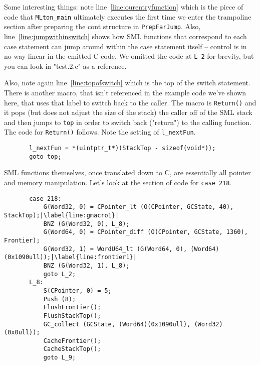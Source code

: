 Some interesting things: note line~\ref{line:ourentryfunction} which is the piece of code that \texttt{MLton\_main} ultimately executes the first time we enter the trampoline section after preparing the cont structure in \texttt{PrepFarJump}. Also, line~\ref{line:jumpwithinswitch} shows how SML functions that correspond to each case statement can jump around within the case statement itself -- control is in no way linear in the emitted C code. We omitted the code at \texttt{L\_2} for brevity, but you can look in "test.2.c" as a reference.

Also, note again line~\ref{line:topofswitch} which is the top of the switch statement. There is another macro, that isn't referenced in the example code we've shown here, that uses that label to switch back to the caller. The macro is \texttt{Return()} and it pops (but does not adjust the size of the stack) the caller off of the SML stack and then jumps to \texttt{top} in order to switch back ("return") to the calling function. The code for \texttt{Return()} follows. Note the setting of \texttt{l\_nextFun}. 

\begin{minipage}{\linewidth}
\lstset{language=C}\begin{lstlisting}
       l_nextFun = *(uintptr_t*)(StackTop - sizeof(void*));
       goto top;
\end{lstlisting}
\end{minipage}

SML functions themselves, once translated down to C, are essentially all pointer and memory manipulation. Let's look at the section of code for \texttt{case 218}.

\begin{minipage}{\linewidth}
\lstset{language=C}\begin{lstlisting}
       case 218:
           G(Word32, 0) = CPointer_lt (O(CPointer, GCState, 40), StackTop);|\label{line:gmacro1}|
           BNZ (G(Word32, 0), L_8);
           G(Word64, 0) = CPointer_diff (O(CPointer, GCState, 1360), Frontier);
           G(Word32, 1) = WordU64_lt (G(Word64, 0), (Word64)(0x1090ull));|\label{line:frontier1}|
           BNZ (G(Word32, 1), L_8);
           goto L_2;
       L_8:
           S(CPointer, 0) = 5;
           Push (8);
           FlushFrontier();
           FlushStackTop();
           GC_collect (GCState, (Word64)(0x1090ull), (Word32)(0x0ull));
           CacheFrontier();
           CacheStackTop();
           goto L_9;
\end{lstlisting}
\end{minipage}

